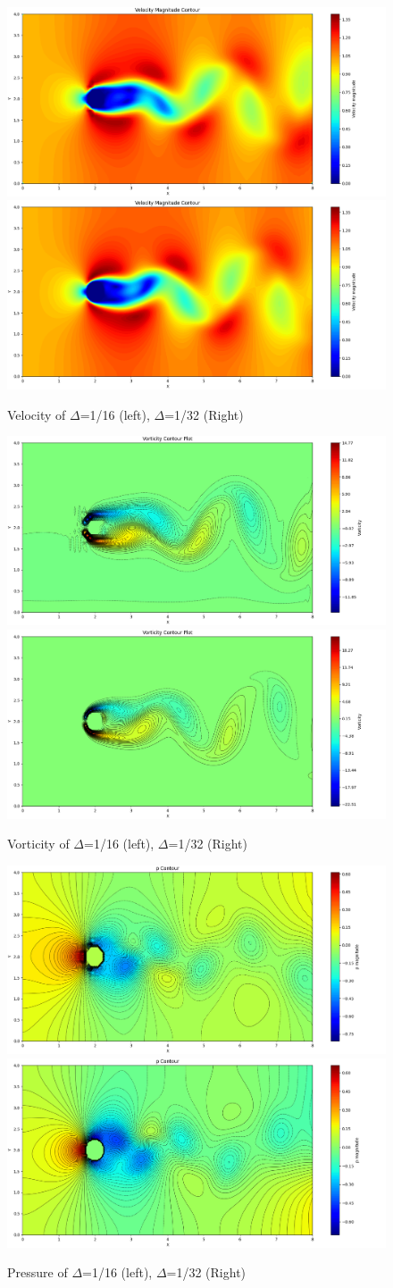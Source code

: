 \documentclass[12pt]{article}
\begin{document}
\begin{figure}[H]
    \centering
    \includegraphics[width=0.45\linewidth]{figure/N16_Re150_8x4_t100/v_N16_Re150_8x4_t100.jpg}
    \includegraphics[width=0.45\linewidth]{figure/N32_Re150_8x4_t100/v_N32_Re150_8x4_t100.jpg}
    \caption{Velocity of $\Delta$=1/16 (left), $\Delta$=1/32 (Right) }
\end{figure}



\begin{figure}[H]
    \centering
    \includegraphics[width=0.45\linewidth]{figure/N16_Re150_8x4_t100/vor_N16_Re150_8x4_t100.jpg}
    \includegraphics[width=0.45\linewidth]{figure/N32_Re150_8x4_t100/vor_N32_Re150_8x4_t100.jpg}
    \caption{Vorticity of $\Delta$=1/16 (left), $\Delta$=1/32 (Right) }
\end{figure}

\begin{figure}[H]
    \centering
    \includegraphics[width=0.45\linewidth]{figure/N16_Re150_8x4_t100/p_N16_Re150_8x4_t100.jpg}
    \includegraphics[width=0.45\linewidth]{figure/N32_Re150_8x4_t100/p_N32_Re150_8x4_t100.jpg}
    \caption{Pressure of $\Delta$=1/16 (left), $\Delta$=1/32 (Right)}
\end{figure}
\end{document}
